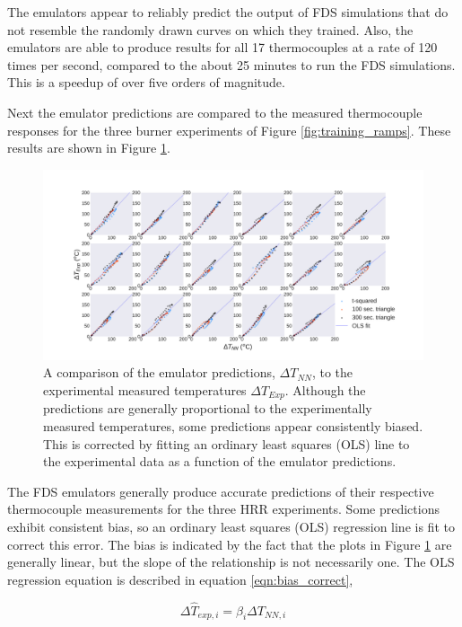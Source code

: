 \documentclass{article}
\begin{document}
The emulators appear to reliably predict the output of FDS simulations that do not resemble the randomly drawn curves on which they trained. Also, the emulators are able to produce results for all 17 thermocouples at a rate of 120 times per second, compared to the about 25 minutes to run the FDS simulations. This is a speedup of over five orders of magnitude. 

Next the emulator predictions are compared to the measured thermocouple responses for the three burner experiments of Figure \ref{fig:training_ramps}. These results are shown in Figure \ref{fig:fds_vs_reality}.


\begin{figure}[htb] \centering
\includegraphics[width=1\textwidth]{figures/fds_vs_reality.pdf}
\caption{A comparison of the emulator predictions, $\Delta T_{NN}$, to the experimental measured temperatures $\Delta T_{Exp}$. Although the predictions are generally proportional to the experimentally measured temperatures, some predictions appear consistently biased. This is corrected by fitting an ordinary least squares (OLS) line to the experimental data as a function of the emulator predictions.}
\label{fig:fds_vs_reality}
\end{figure}

The FDS emulators generally produce accurate predictions of their respective thermocouple measurements for the three HRR experiments. Some predictions exhibit consistent bias, so an ordinary least squares (OLS) regression line is fit to correct this error. The bias is indicated by the fact that the plots in Figure \ref{fig:fds_vs_reality} are generally linear, but the slope of the relationship is not necessarily one. The OLS regression equation is described in equation \ref{eqn:bias_correct},  


\begin{equation}
  \label{eqn:bias_correct}
 \Delta \hat{T}_{exp, i} = \beta_i \Delta T _{NN, i}
\end{equation}
\end{document}
